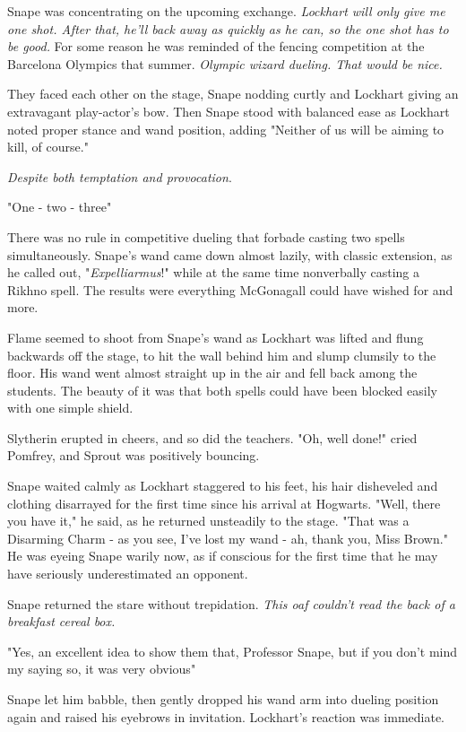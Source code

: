 Snape was concentrating on the upcoming exchange. \emph{Lockhart will only give me one shot. After that, he'll back away as quickly as he can, so the one shot has to be good.} For some reason he was reminded of the fencing competition at the Barcelona Olympics that summer. \emph{Olympic wizard dueling. That would be nice.}

They faced each other on the stage, Snape nodding curtly and Lockhart giving an extravagant play-actor's bow. Then Snape stood with balanced ease as Lockhart noted proper stance and wand position, adding "Neither of us will be aiming to kill, of course."

\emph{Despite both temptation and provocation}.

"One - two - three{\el}"

There was no rule in competitive dueling that forbade casting two spells simultaneously. Snape's wand came down almost lazily, with classic extension, as he called out, "\emph{Expelliarmus}!" while at the same time nonverbally casting a Rikhno spell. The results were everything McGonagall could have wished for and more.

Flame seemed to shoot from Snape's wand as Lockhart was lifted and flung backwards off the stage, to hit the wall behind him and slump clumsily to the floor. His wand went almost straight up in the air and fell back among the students. The beauty of it was that both spells could have been blocked easily with one simple shield.

Slytherin erupted in cheers, and so did the teachers. "Oh, well done!" cried Pomfrey, and Sprout was positively bouncing.

Snape waited calmly as Lockhart staggered to his feet, his hair disheveled and clothing disarrayed for the first time since his arrival at Hogwarts. "Well, there you have it," he said, as he returned unsteadily to the stage. "That{\el} was a Disarming Charm - as you see, I've lost my wand - ah, thank you, Miss Brown." He was eyeing Snape warily now, as if conscious for the first time that he may have seriously underestimated an opponent.

Snape returned the stare without trepidation. \emph{This oaf couldn't read the back of a breakfast cereal box.}

"Yes, an excellent idea to show them that, Professor Snape, but if you don't mind my saying so, it was very obvious{\el}"

Snape let him babble, then gently dropped his wand arm into dueling position again and raised his eyebrows in invitation. Lockhart's reaction was immediate.

